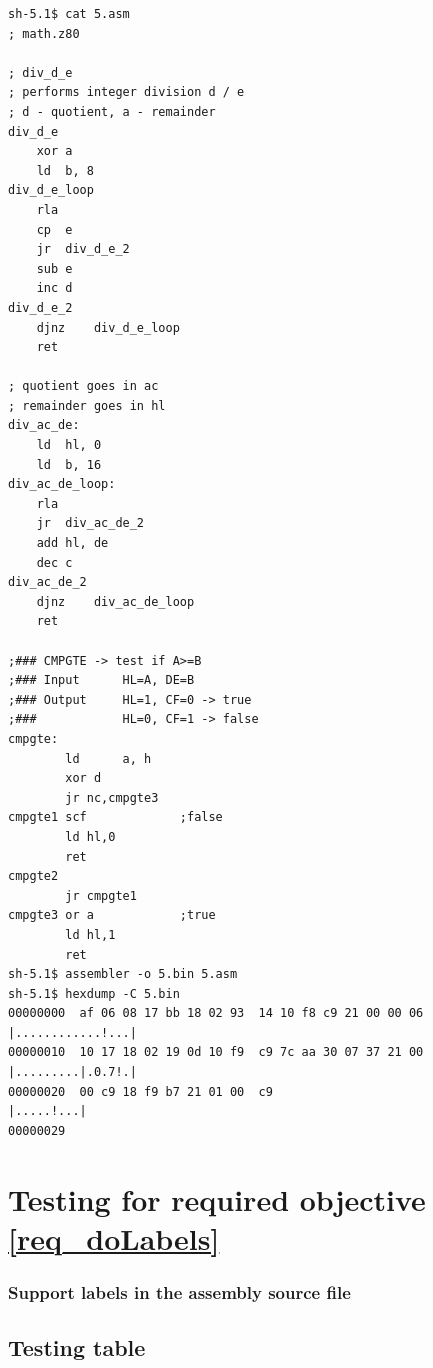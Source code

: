 \documentclass[a4paper]{report}
\begin{document}
\begin{lstlisting}
sh-5.1$ cat 5.asm
; math.z80

; div_d_e
; performs integer division d / e
; d - quotient, a - remainder
div_d_e
	xor	a
	ld	b, 8
div_d_e_loop
	rla
	cp	e
	jr	div_d_e_2
	sub	e
	inc	d
div_d_e_2
	djnz	div_d_e_loop
	ret

; quotient goes in ac
; remainder goes in hl
div_ac_de:
	ld	hl, 0
	ld	b, 16
div_ac_de_loop:
	rla
	jr	div_ac_de_2
	add	hl, de
	dec	c
div_ac_de_2
	djnz	div_ac_de_loop
	ret

;### CMPGTE -> test if A>=B
;### Input      HL=A, DE=B
;### Output     HL=1, CF=0 -> true
;###            HL=0, CF=1 -> false
cmpgte:
		ld		a, h
		xor d
		jr nc,cmpgte3
cmpgte1	scf             ;false
		ld hl,0
		ret
cmpgte2
		jr cmpgte1
cmpgte3	or a            ;true
		ld hl,1
		ret
sh-5.1$ assembler -o 5.bin 5.asm
sh-5.1$ hexdump -C 5.bin
00000000  af 06 08 17 bb 18 02 93  14 10 f8 c9 21 00 00 06  |............!...|
00000010  10 17 18 02 19 0d 10 f9  c9 7c aa 30 07 37 21 00  |.........|.0.7!.|
00000020  00 c9 18 f9 b7 21 01 00  c9                       |.....!...|
00000029
\end{lstlisting}



\section{Testing for required objective \ref{req_doLabels}}

\subsubsection{Support labels in the assembly source file}

\subsection{Testing table}
\end{document}
